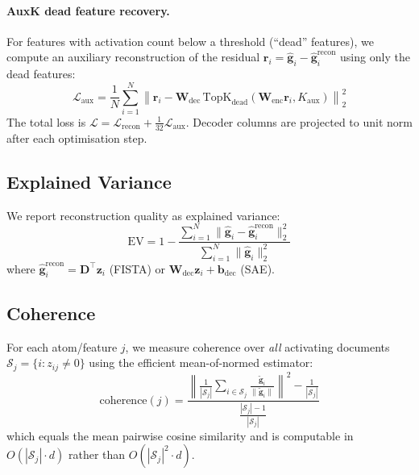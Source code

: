 \paragraph{AuxK dead feature recovery.} For features with activation count below a threshold (``dead'' features), we compute an auxiliary reconstruction of the residual $\mathbf{r}_i = \hat{\mathbf{g}}_i - \hat{\mathbf{g}}_i^{\text{recon}}$ using only the dead features:
\begin{equation}
    \mathcal{L}_{\text{aux}} = \frac{1}{N} \sum_{i=1}^{N} \left\| \mathbf{r}_i - \mathbf{W}_{\text{dec}} \, \text{TopK}_{\text{dead}}(\mathbf{W}_{\text{enc}} \mathbf{r}_i, K_{\text{aux}}) \right\|_2^2
\end{equation}
The total loss is $\mathcal{L} = \mathcal{L}_{\text{recon}} + \frac{1}{32} \mathcal{L}_{\text{aux}}$. Decoder columns are projected to unit norm after each optimisation step.

\subsection{Explained Variance}

We report reconstruction quality as explained variance:
\begin{equation}
    \text{EV} = 1 - \frac{\sum_{i=1}^{N} \|\hat{\mathbf{g}}_i - \hat{\mathbf{g}}_i^{\text{recon}}\|_2^2}{\sum_{i=1}^{N} \|\hat{\mathbf{g}}_i\|_2^2}
\end{equation}
where $\hat{\mathbf{g}}_i^{\text{recon}} = \mathbf{D}^\top \mathbf{z}_i$ (FISTA) or $\mathbf{W}_{\text{dec}} \mathbf{z}_i + \mathbf{b}_{\text{dec}}$ (SAE).

\subsection{Coherence}

For each atom/feature $j$, we measure coherence over \emph{all} activating documents $\mathcal{S}_j = \{i : z_{ij} \neq 0\}$ using the efficient mean-of-normed estimator:
\begin{equation}
    \text{coherence}(j) = \frac{\left\| \frac{1}{|\mathcal{S}_j|} \sum_{i \in \mathcal{S}_j} \frac{\tilde{\mathbf{g}}_i}{\|\tilde{\mathbf{g}}_i\|} \right\|^2 - \frac{1}{|\mathcal{S}_j|}}{\frac{|\mathcal{S}_j| - 1}{|\mathcal{S}_j|}}
\end{equation}
which equals the mean pairwise cosine similarity and is computable in $O(|\mathcal{S}_j| \cdot d)$ rather than $O(|\mathcal{S}_j|^2 \cdot d)$.

